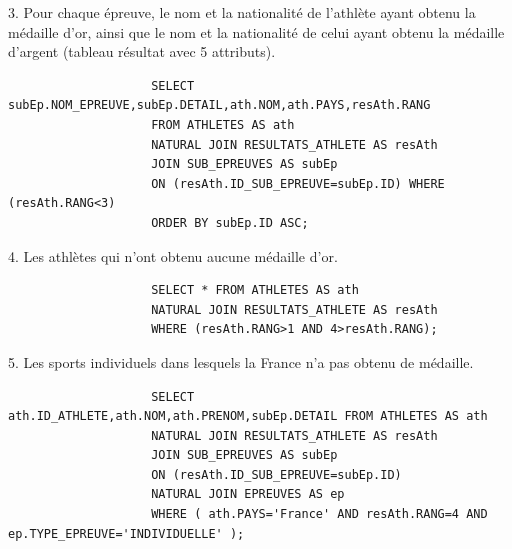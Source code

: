 \documentclass[]{scrreprt}
\begin{document}
			\vspace{0.5cm}
			
			{\large 
				3. Pour chaque épreuve, le nom et la nationalité de l'athlète ayant obtenu la médaille d'or, ainsi que le
				nom et la nationalité de celui ayant obtenu la médaille d'argent (tableau résultat avec 5 attributs).
				
			}
			
			{\footnotesize 
				\begin{tcolorbox}
					\begin{verbatim}
					SELECT subEp.NOM_EPREUVE,subEp.DETAIL,ath.NOM,ath.PAYS,resAth.RANG
					FROM ATHLETES AS ath 
					NATURAL JOIN RESULTATS_ATHLETE AS resAth 
					JOIN SUB_EPREUVES AS subEp
					ON (resAth.ID_SUB_EPREUVE=subEp.ID) WHERE (resAth.RANG<3)
					ORDER BY subEp.ID ASC;
					\end{verbatim}
				\end{tcolorbox}
			}
		
			\newpage
		
			{\large 
				4. Les athlètes qui n'ont obtenu aucune médaille d'or.
				
			}
			
			{\footnotesize 
				\begin{tcolorbox}
					\begin{verbatim}
					SELECT * FROM ATHLETES AS ath 
					NATURAL JOIN RESULTATS_ATHLETE AS resAth
					WHERE (resAth.RANG>1 AND 4>resAth.RANG);
					\end{verbatim}
				\end{tcolorbox}
			}
		
			\vspace{0.5cm}
		
			{\large 
				5. Les sports individuels dans lesquels la France n'a pas obtenu de médaille.
				
			}
			
			{\footnotesize 
				\begin{tcolorbox}
					\begin{verbatim}
					SELECT ath.ID_ATHLETE,ath.NOM,ath.PRENOM,subEp.DETAIL FROM ATHLETES AS ath 
					NATURAL JOIN RESULTATS_ATHLETE AS resAth 
					JOIN SUB_EPREUVES AS subEp
					ON (resAth.ID_SUB_EPREUVE=subEp.ID) 
					NATURAL JOIN EPREUVES AS ep
					WHERE ( ath.PAYS='France' AND resAth.RANG=4 AND ep.TYPE_EPREUVE='INDIVIDUELLE' );
					\end{verbatim}
				\end{tcolorbox}
			}
		
			\vspace{0.5cm}
			
\end{document}
